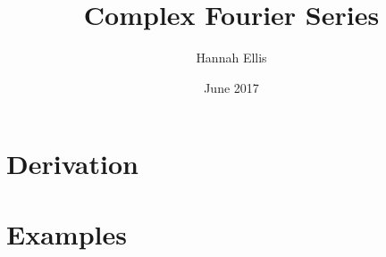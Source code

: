 \documentclass[11pt,twoside,a5paper]{book}
\begin{document}
\title{Complex Fourier Series}
\author{Hannah Ellis}
\date{June 2017}
\maketitle
\tableofcontents
\chapter{Derivation}


\chapter{Examples}

\end{document}
